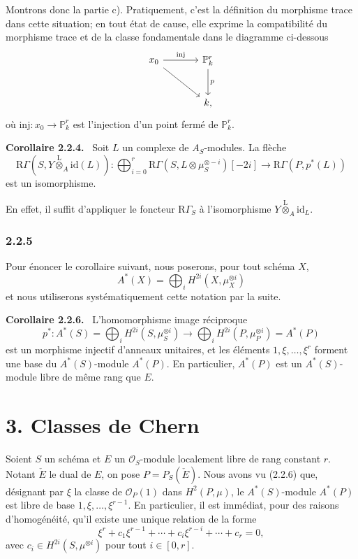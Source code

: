 \documentclass[11pt]{article}
\newenvironment{statement}[1]{\par\medskip\noindent\textbf{#1.}\ }{\par\medskip}
\providecommand{\lten}{\overset{\mathrm L}{\otimes}}
\providecommand{\lten}{\overset{\mathrm L}{\otimes}}
\providecommand{\lten}{\overset{\mathrm L}{\otimes}}
\providecommand{\lten}{\overset{\mathrm L}{\otimes}}
\providecommand{\lten}{\overset{\mathrm L}{\otimes}}
\providecommand{\lten}{\overset{\mathrm L}{\otimes}}
\begin{document}
Montrons donc la partie c). Pratiquement, c'est la définition du morphisme trace dans cette situation; en tout état de cause, elle exprime la compatibilité du morphisme trace et de la classe fondamentale dans le diagramme ci-dessous
\[
\begin{tikzcd}[column sep=large,row sep=large]
x_0 \arrow[r,"\mathrm{inj}"] \arrow[dr] & \mathbb P^r_k \arrow[d,"p"]\\
& k ,
\end{tikzcd}
\]
où $\mathrm{inj}:x_0\to \mathbb P^r_k$ est l'injection d'un point fermé de $\mathbb P^r_k$.

\begin{statement}{Corollaire 2.2.4}
Soit $L$ un complexe de $A_S$-modules. La flèche
\[
\mathrm R\Gamma(S,Y\lten_A\mathrm{id}(L)):
\bigoplus_{i=0}^r \mathrm R\Gamma(S,L\otimes\mu_S^{\otimes -i})[-2i]
\longrightarrow
\mathrm R\Gamma(P,p^*(L))
\]
est un isomorphisme.
\end{statement}

En effet, il suffit d'appliquer le foncteur $\mathrm R\Gamma_S$ à l'isomorphisme $Y\lten_A\mathrm{id}_L$.

\subsubsection*{2.2.5}
Pour énoncer le corollaire suivant, nous poserons, pour tout schéma $X$,
\[
A^*(X)=\bigoplus_i H^{2i}(X,\mu_X^{\otimes i})
\]
et nous utiliserons systématiquement cette notation par la suite.

\begin{statement}{Corollaire 2.2.6}
L'homomorphisme image réciproque
\[
p^*:A^*(S)=\bigoplus_i H^{2i}(S,\mu_S^{\otimes i})
\longrightarrow
\bigoplus_i H^{2i}(P,\mu_P^{\otimes i})=A^*(P)
\]
est un morphisme injectif d'anneaux unitaires, et les éléments $1,\xi,\ldots,\xi^r$ forment une base du $A^*(S)$-module $A^*(P)$. En particulier, $A^*(P)$ est un $A^*(S)$-module libre de même rang que $E$.
\end{statement}

\section*{3. Classes de Chern}

Soient $S$ un schéma et $E$ un $\mathcal O_S$-module localement libre de rang constant $r$. Notant $\check E$ le dual de $E$, on pose $P=P_S(\check E)$. Nous avons vu (2.2.6) que, désignant par $\xi$ la classe de $\mathcal O_P(1)$ dans $H^2(P,\mu)$, le $A^*(S)$-module $A^*(P)$ est libre de base $1,\xi,\ldots,\xi^{r-1}$. En particulier, il est immédiat, pour des raisons d'homogénéité, qu'il existe une unique relation de la forme
\[
\xi^r+c_1\xi^{r-1}+\cdots+c_i\xi^{r-i}+\cdots+c_r=0,
\tag{3.1}
\]
avec $c_i\in H^{2i}(S,\mu^{\otimes i})$ pour tout $i\in[0,r]$.
\end{document}
